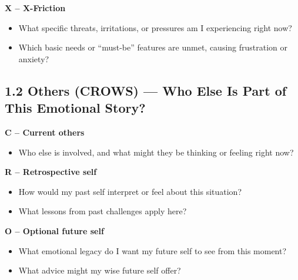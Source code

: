 \documentclass[11pt]{article}
\begin{document}
\textbf{X – X-Friction}

\begin{itemize}[noitemsep]
  \item What specific threats, irritations, or pressures am I experiencing right now?
  \item Which basic needs or “must-be” features are unmet, causing frustration or anxiety?
\end{itemize}
\begin{answerbox}
\vspace{3em}
\end{answerbox}

\subsection*{1.2 Others (CROWS) — Who Else Is Part of This Emotional Story?}

\textbf{C – Current others}

\begin{itemize}[noitemsep]
  \item Who else is involved, and what might they be thinking or feeling right now?
\end{itemize}
\begin{answerbox}
\vspace{3em}
\end{answerbox}

\textbf{R – Retrospective self}

\begin{itemize}[noitemsep]
  \item How would my past self interpret or feel about this situation?
  \item What lessons from past challenges apply here?
\end{itemize}
\begin{answerbox}
\vspace{4em}
\end{answerbox}

\textbf{O – Optional future self}

\begin{itemize}[noitemsep]
  \item What emotional legacy do I want my future self to see from this moment?
  \item What advice might my wise future self offer?
\end{itemize}
\begin{answerbox}
\vspace{4em}
\end{answerbox}
\end{document}

